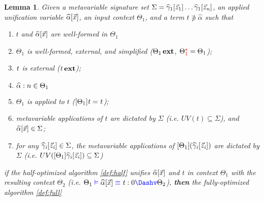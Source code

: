 \documentclass[a4,natbib=false]{article}
\newcommand{\niton}{\not\owns}
\newtheorem{lemma}{Lemma}
\begin{document}
\begin{lemma}
  Given a metavariable signature set  $\Sigma = \widehat{\gamma}_{{\mathrm{1}}}  [  \vec{z}_{{\mathrm{1}}}  ] \dots \widehat{\gamma}_{{\mathrm{1}}}  [  \vec{z}_{\mathit{n}}  ]$,
  an applied unification variable $\widehat{\alpha}  [  \vec{x}  ]$, an input context $\Theta_{{\mathrm{1}}}$,
  and a term $t \niton \widehat{\alpha}$ such that
  \begin{enumerate}
  \item $t$ and $\widehat{\alpha}  [  \vec{x}  ]$ are well-formed in $\Theta_{{\mathrm{1}}}$
  \item $\Theta_{{\mathrm{1}}}$  is well-formed, external, and simplified ($ \Theta_{{\mathrm{1}}} \, \mathbf{ext} $,  $ \Theta_{{\mathrm{1}}} ^{\color{red}\star}  = \Theta_{{\mathrm{1}}}$);
  \item $\mathit{t}$ is external ($\mathit{t} \, \mathbf{ext}$);
  \item $\widehat{\alpha}  :  n \in \Theta_{{\mathrm{1}}}$
  \item $ \Theta_{{\mathrm{1}}} $ is applied to $t$ ($[  \Theta_{{\mathrm{1}}}  ]  \mathit{t} = \mathit{t}$);
  \item metavariable applications of $t$ are dictated by $\Sigma$
    (i.e. $UV(t) \subseteq \Sigma$), and $\widehat{\alpha}  [  \vec{x}  ] \in \Sigma$;
  \item for any $ \widehat{\gamma}_{\mathit{i}}  [  \vec{z}_{\mathit{i}}  ] \in \Sigma $, the metavariable applications of
    $ [  \Theta_{{\mathrm{1}}}  ]  (  \widehat{\gamma}_{\mathit{i}}  [  \vec{z}_{\mathit{i}}  ]  ) $ are dictated by $\Sigma$
    (i.e. $UV([  \Theta_{{\mathrm{1}}}  ]  \widehat{\gamma}_{\mathit{i}}  [  \vec{z}_{\mathit{i}}  ]) \subseteq \Sigma$)
  \end{enumerate}
  if the half-optimized algorithm \ref{def:half} unifies $\widehat{\alpha}  [  \vec{x}  ]$ and
  $t$ in context $\Theta_{{\mathrm{1}}}$ with the resulting context $\Theta_{{\mathrm{2}}}$
  (i.e. $\Theta_{{\mathrm{1}}}  \mathcolor{\rcolor}{\vDash}  \widehat{\alpha}  \ottsym{[}  \vec{x}  \ottsym{]}  \mathcolor{\rcolor}{\equiv}  \ottnt{t}  \ottsym{:}  \ottsym{0}  \mathcolor{\rcolor}{\Dashv}  \Theta_{{\mathrm{2}}}$),
  \textbf{then} the fully-optimized algorithm \ref{def:full}

\end{lemma}
\end{document}
